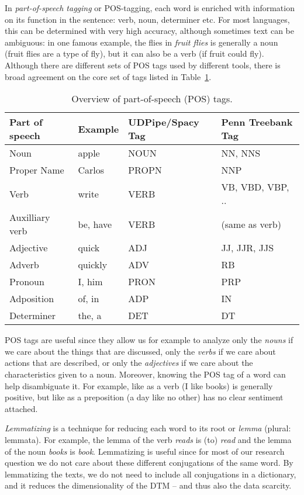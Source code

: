 In \emph{part-of-speech tagging} or POS-tagging, each word is enriched with information on its function in the sentence: verb, noun, determiner etc.
For most languages, this can be determined with very high accuracy, although sometimes text can be ambiguous:
in one famous example, the flies in \emph{fruit flies} is generally a noun (fruit flies are a type of fly), but it can also be a verb (if fruit could fly).
Although there are different sets of POS tags used by different tools, there is broad agreement on the core set of tags listed in Table~\ref{tab:postags}.

%

\begin{table}
  \caption{\label{tab:postags}Overview of part-of-speech (POS) tags.}{
  \begin{tabularx}{\textwidth}{llll}
    \toprule
    Part of speech & Example & UDPipe/Spacy Tag & Penn Treebank Tag \\
    \midrule
    Noun            & apple & NOUN & NN, NNS \\
    Proper Name     & Carlos & PROPN & NNP \\
    Verb            & write & VERB & VB, VBD, VBP, .. \\
    Auxilliary verb & be, have & VERB & (same as verb) \\
    Adjective       & quick & ADJ & JJ, JJR, JJS \\
    Adverb          & quickly & ADV & RB \\
    Pronoun         & I, him  & PRON & PRP \\
    Adposition      & of, in  & ADP & IN \\
    Determiner      & the, a & DET & DT \\
\bottomrule
  \end{tabularx}}{}
  \end{table}


POS tags are useful since they allow us for example to analyze only the \textit{nouns} if we care about the things that are discussed, only the \textit{verbs} if we care about actions that are described, or only the \textit{adjectives} if we care about the characteristics given to a noun.
Moreover, knowing the POS tag of a word can help disambiguate it.
For example, like as a verb (I like books) is generally positive, but like as a preposition (a day like no other) has no clear sentiment attached.

\emph{Lemmatizing} is a technique for reducing each word to its root or \emph{lemma} (plural: lemmata).
For example, the lemma of the verb \emph{reads} is (to) \emph{read} and the lemma of the noun \emph{books} is \emph{book}.
Lemmatizing is useful since for most of our research question we do not care about these different conjugations of the same word.
By lemmatizing the texts, we do not need to include all conjugations in a dictionary,
and it reduces the dimensionality of the DTM -- and thus also the data scarcity.

